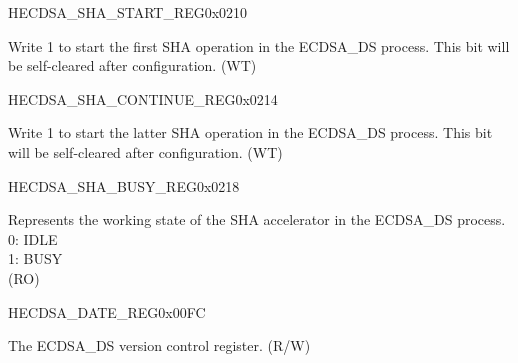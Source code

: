 \begin{register}{H}{ECDSA\_SHA\_START\_REG}{0x0210}\label{regdesc:ECDSASHASTARTREG}
%
%
\regnewline%
\begin{regdesc}\begin{reglist}
\label{fielddesc:ECDSASHASTART}\item [ECDSA\_SHA\_START] Write 1 to start the first SHA operation in the ECDSA\_DS process. This bit will be self-cleared after configuration. (WT)
\end{reglist}\end{regdesc}
\end{register}


\begin{register}{H}{ECDSA\_SHA\_CONTINUE\_REG}{0x0214}\label{regdesc:ECDSASHACONTINUEREG}
%
%
\regnewline%
\begin{regdesc}\begin{reglist}
\label{fielddesc:ECDSASHACONTINUE}\item [ECDSA\_SHA\_CONTINUE] Write 1 to start the latter SHA operation in the ECDSA\_DS process. This bit will be self-cleared after configuration. (WT)
\end{reglist}\end{regdesc}
\end{register}


\begin{register}{H}{ECDSA\_SHA\_BUSY\_REG}{0x0218}\label{regdesc:ECDSASHABUSYREG}
%
%
\regnewline%
\begin{regdesc}\begin{reglist}
\label{fielddesc:ECDSASHABUSY}\item [ECDSA\_SHA\_BUSY] Represents the working state of the SHA accelerator in the ECDSA\_DS process.\\
0: IDLE\\
1: BUSY\\
(RO)
\end{reglist}\end{regdesc}
\end{register}


\begin{register}{H}{ECDSA\_DATE\_REG}{0x00FC}\label{regdesc:ECDSADATEREG}
%
%
\regnewline%
\begin{regdesc}\begin{reglist}
\label{fielddesc:ECDSADATE}\item [ECDSA\_DATE] The ECDSA\_DS version control register. (R/W)
\end{reglist}\end{regdesc}
\end{register}
